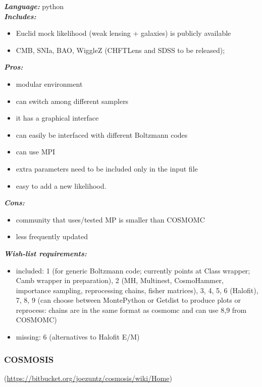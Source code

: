 {\it \bf Language:} python\\

{\it \bf Includes:}
\begin{itemize}
 \item Euclid mock likelihood (weak lensing + galaxies) is publicly available
 \item CMB, SNIa, BAO, WiggleZ (CHFTLens and SDSS to be released); 
\end{itemize}

{\it \bf Pros: }
\begin{itemize}
 \item modular environment
 \item can switch among different samplers
 \item it has a graphical interface
 \item can easily be interfaced with different Boltzmann codes
 \item can use MPI
 \item extra parameters need to be included only in the input file
 \item easy to add a new likelihood.
\end{itemize}

{\it \bf Cons:} 
\begin{itemize}
 \item community that uses/tested MP is smaller than COSMOMC
 \item less frequently updated 
\end{itemize}

{\it \bf Wish-list requirements: }
\begin{itemize}
 \item included: 1 (for generic Boltzmann code; currently points at Class wrapper; Camb wrapper in preparation), 2 (MH, Multinest, CosmoHammer, importance sampling, reprocessing chains, fisher matrices), 3, 4, 5, 6 (Halofit), 7, 8, 9 (can choose between MontePython or Getdist to produce plots or reprocess: chains are in the same format as cosmomc and can use 8,9 from COSMOMC) 
 \item missing: 6 (alternatives to Halofit E/M) 
\end{itemize}

\newpage
\subsubsection{COSMOSIS}
(\url{https://bitbucket.org/joezuntz/cosmosis/wiki/Home})\\

